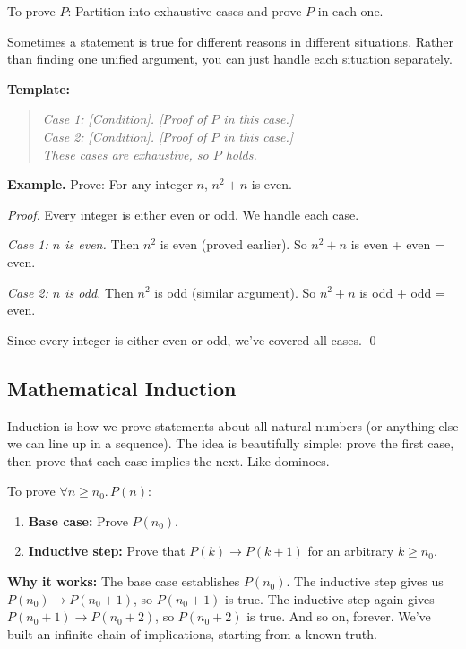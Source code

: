 \begin{strategy}
To prove $P$: Partition into exhaustive cases and prove $P$ in each one.

Sometimes a statement is true for different reasons in different situations. Rather than finding one unified argument, you can just handle each situation separately.

\textbf{Template:}
\begin{quote}
\emph{Case 1: [Condition]. [Proof of $P$ in this case.]}\\
\emph{Case 2: [Condition]. [Proof of $P$ in this case.]}\\
\emph{These cases are exhaustive, so $P$ holds.}
\end{quote}

\textbf{Example.} Prove: For any integer $n$, $n^2 + n$ is even.

\emph{Proof.} Every integer is either even or odd. We handle each case.

\emph{Case 1: $n$ is even.} Then $n^2$ is even (proved earlier). So $n^2 + n$ is even + even = even. \checkmark

\emph{Case 2: $n$ is odd.} Then $n^2$ is odd (similar argument). So $n^2 + n$ is odd + odd = even. \checkmark

Since every integer is either even or odd, we've covered all cases. \qed
\end{strategy}

\subsection*{Mathematical Induction}

Induction is how we prove statements about all natural numbers (or anything else we can line up in a sequence). The idea is beautifully simple: prove the first case, then prove that each case implies the next. Like dominoes.

\begin{strategy}
To prove $\forall n \geq n_0.\, P(n)$:
\begin{enumerate}
  \item \textbf{Base case:} Prove $P(n_0)$.
  \item \textbf{Inductive step:} Prove that $P(k) \to P(k+1)$ for an arbitrary $k \geq n_0$.
\end{enumerate}

\textbf{Why it works:} The base case establishes $P(n_0)$. The inductive step gives us $P(n_0) \to P(n_0+1)$, so $P(n_0+1)$ is true. The inductive step again gives $P(n_0+1) \to P(n_0+2)$, so $P(n_0+2)$ is true. And so on, forever. We've built an infinite chain of implications, starting from a known truth.
\end{strategy}

